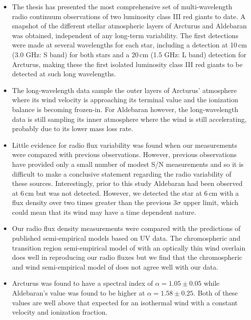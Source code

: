\begin{itemize}
	\item The thesis has presented the most comprehensive set of multi-wavelength radio continuum observations of two luminosity class III red giants to date. A snapshot of the different stellar atmospheric layers of Arcturus and Aldebaran was obtained, independent of any long-term variability. The first detections were made at several wavelengths for each star, including a detection at 10\,cm (3.0 GHz: S band) for both stars and a 20\,cm (1.5 GHz: L band) detection for Arcturus, making these the first isolated luminosity class III red giants to be detected at such long wavelengths.
  
	\item The long-wavelength data sample the outer layers of Arcturus' atmosphere where its wind velocity is approaching its terminal value and the ionization balance is becoming frozen-in. For Aldebaran however, the long-wavelength data is still sampling its inner atmosphere where the wind is still accelerating, probably due to its lower mass loss rate. 

	\item Little evidence for radio flux variability was found when our measurements were compared with previous observations. However, previous observations have provided only a small number of modest S/N measurements and so it is difficult to make a conclusive statement regarding the radio variability of these sources. Interestingly, prior to this study Aldebaran had been observed at 6\,cm but was not detected. However, we detected the star at 6\,cm with a flux density over two times greater than the previous $3\sigma$ upper limit, which could mean that its wind may have a time dependent nature.
	  
	\item Our radio flux density measurements were compared with the predictions of published semi-empirical models based on UV data. The chromospheric and transition region semi-empirical model of \cite{mcmurry_1999} with an optically thin wind overlain does well in reproducing our radio fluxes but we find that the chromospheric and wind semi-empirical model of \cite{drake_1985} does not agree well with our data.
  
	\item Arcturus was found to have a spectral index of $\alpha = 1.05 \pm 0.05$ while Aldebaran's value was found to be higher at $\alpha = 1.58 \pm 0.25$. Both of these values are well above that expected for an isothermal wind with a constant velocity and ionization fraction.


\end{itemize}
